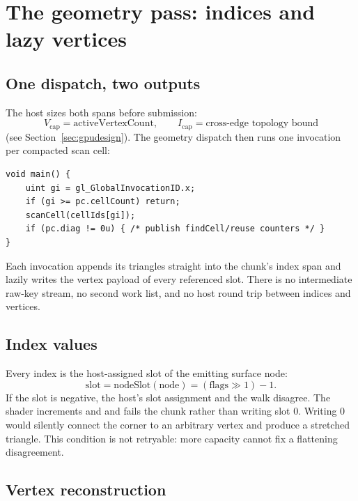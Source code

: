 \section{The geometry pass: indices and lazy vertices}
\label{sec:finalize}

\subsection{One dispatch, two outputs}

The host sizes both spans before submission:
\begin{equation}
  V_{\text{cap}} = \text{activeVertexCount},\qquad
  I_{\text{cap}} = \text{cross-edge topology bound}
\end{equation}
(see Section~\ref{sec:gpudesign}).  The geometry dispatch then runs one
invocation per compacted scan cell:
\begin{lstlisting}[style=glsl,caption={Geometry stage.},label={lst:geometry}]
void main() {
    uint gi = gl_GlobalInvocationID.x;
    if (gi >= pc.cellCount) return;
    scanCell(cellIds[gi]);
    if (pc.diag != 0u) { /* publish findCell/reuse counters */ }
}
\end{lstlisting}
Each invocation appends its triangles straight into the chunk's index span
and lazily writes the vertex payload of every referenced slot.  There is no
intermediate raw-key stream, no second work list, and no host round trip
between indices and vertices.

\subsection{Index values}

Every index is the host-assigned slot of the emitting surface node:
\begin{equation}
  \text{slot} = \text{nodeSlot}(\text{node}) = (\text{flags}\gg1)-1.
\end{equation}
If the slot is negative, the host's slot assignment and the walk disagree.
The shader increments  and  and
fails the chunk rather than writing slot 0.  Writing 0 would silently
connect the corner to an arbitrary vertex and produce a stretched triangle.
This condition is not retryable: more capacity cannot fix a flattening
disagreement.

\subsection{Vertex reconstruction}

